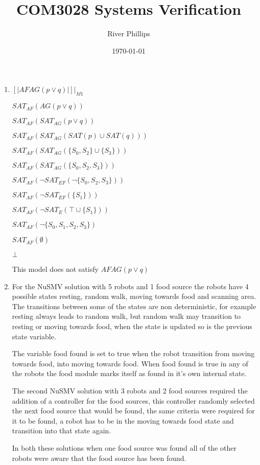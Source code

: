 \documentclass[12pt, a4paper]{article}
\title{COM3028 Systems Verification}
\author{River Phillips}
\date{\today}
\begin{document}
\maketitle

\begin{enumerate}
\item 
$[|AF AG (p \lor q)|]|_{M1}$

$SAT_{AF}(AG(p \lor q))$

$SAT_{AF}(SAT_{AG}(p \lor q))$

$SAT_{AF}(SAT_{AG}(SAT(p) \cup SAT(q)))$

$SAT_{AF}(SAT_{AG}(\{S_0, S_2\} \cup \{S_3\}))$

$SAT_{AF}(SAT_{AG}(\{S_0, S_2, S_3\}))$

$SAT_{AF}(\neg SAT_{EF}(\neg \{S_0, S_2, S_3\}))$

$SAT_{AF}(\neg SAT_{EF}( \{S_1\}))$

$SAT_{AF}(\neg SAT_{E}(\top \cup \{S_1 \} ))$

$SAT_{AF}(\neg \{S_0, S_1, S_2, S_3 \})$

$SAT_{AF}(\emptyset)$

$\bot$


This model does not satisfy $AF AG (p \lor q)$

\item 

	For the NuSMV solution with 5 robots and 1 food source the robots have 4 possible states resting, random walk, moving towards food and scanning area. The transitions between some of the states are non deterministic,  for example resting always leads to random walk, but random walk may transition to resting or moving towards food, when the state is updated so is the previous state variable.
	
	 The variable food found is set to true when the robot transition from moving towards food, into moving towards food. When food found is true in any of the robots the food module marks itself as found in it's own internal state.  
	 
	 The second NuSMV solution with 3 robots and 2 food sources required the addition of a controller for the food sources, this controller randomly selected the next food source that would be found, the same criteria were required for it to be found, a robot has to  be in the moving towards food state and transition into that state again.

In both these solutions when one food source was found all of the other robots were aware that the food source has been found. 


\end{enumerate}
\end{document}
